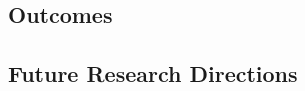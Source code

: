 \documentclass[11pt,twoside]{article}
\numberwithin{Theorem}{section}
\numberwithin{Definition}{section}
\numberwithin{Lemma}{section}
\numberwithin{Algorithm}{section}
\numberwithin{equation}{section}
\begin{document}
\subsection{Outcomes}
\label{subsec:outcomes}


\subsection{Future Research Directions}
\label{subsec:future}

\clearpage

\printbibliography
\clearpage




\end{document}
